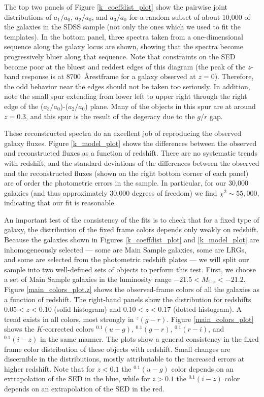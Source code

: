 \documentclass[10pt,preprint]{aastex}
\newcommand{\band}[2]{\ensuremath{^{#1}\!{#2}}}
\begin{document}
The top two panels of Figure \ref{k_coeffdist_plot} show the pairwise
joint distributions of $a_1/a_0$, $a_2/a_0$, and $a_3/a_0$ for a
random subset of about 10,000 of the galaxies in the SDSS sample (not
only the ones which we used to fit the templates). In the bottom
panel, three spectra taken from a one-dimensional sequence along the
galaxy locus are shown, showing that the spectra become progressively
bluer along that sequence. Note that constraints on the SED become
poor at the bluest and reddest edges of this diagram (the peak of the
$z$-band response is at 8700~\AA restframe for a galaxy observed at
$z=0$). Therefore, the odd behavior near the
edges should not be taken too seriously. In addition, note the small
spur extending from lower left to upper right through the right edge
of the ($a_3/a_0$)-($a_2/a_0$) plane. Many of the objects in this spur are
at around $z=0.3$, and this spur is the result of the degeracy due to
the $g$/$r$ gap.

These reconstructed spectra do an excellent job of reproducing the
observed galaxy fluxes. Figure \ref{k_model_plot} shows the
differences between the observed and reconstructed fluxes as a
function of redshift. There are no systematic trends with redshift,
and the standard deviations of the differences between the observed
and the reconstructed fluxes (shown on the right bottom corner of each
panel) are of order the photometric errors in the sample. In
particular, for our 30,000 galaxies (and thus approximately 30,000
degrees of freedom) we find $\chi^2 \sim 55,000$, indicating that our
fit is reasonable. 

An important test of the consistency of the fits is to check that for
a fixed type of galaxy, the distribution of the fixed frame colors
depends only weakly on redshift. Because the galaxies shown in Figures
\ref{k_coeffdist_plot} and \ref{k_model_plot} are inhomogeneously
selected --- some are Main Sample galaxies, some are LRGs, and some
are selected from the photometric redshift plates --- we will split
our sample into two well-defined sets of objects to perform this
test. First, we choose a set of Main Sample galaxies in the luminosity
range $-21.5 < M_{\band{0.1}{r}} < -21.2$. Figure
\ref{main_colors_plot.z} shows the observed-frame colors of all the
galaxies as a function of redshift.  The right-hand panels show the
distribution for redshifts $0.05<z<0.10$ (solid histogram) and
$0.10<z<0.17$ (dotted histogram). A trend exists in all colors, most
strongly in $\band{z}{(g-r)}$. Figure \ref{main_colors_plot} shows the
$K$-corrected colors $\band{0.1}{(u-g)}$, $\band{0.1}{(g-r)}$,
$\band{0.1}{(r-i)}$, and $\band{0.1}{(i-z)}$ in the same manner.  The
plots show a general consistency in the fixed frame color distribution
of these objects with redshift.  Small changes are discernible in the
distributions, mostly attributable to the increased errors at higher
redshift. Note that for $z<0.1$ the $\band{0.1}{(u-g)}$ color depends
on an extrapolation of the SED in the blue, while for $z>0.1$ the
$\band{0.1}{(i-z)}$ color depends on an extrapolation of the SED in
the red.
\end{document}
